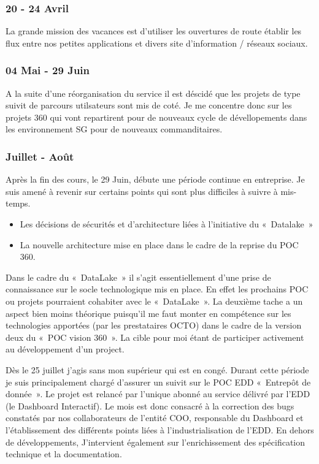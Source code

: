 \subsubsection*{20 - 24 Avril}
La grande mission des vacances est d'utiliser les ouvertures de route établir les flux entre nos petites applications et divers site d'information / réseaux sociaux.

\subsubsection*{04 Mai - 29 Juin}
A la suite d'une réorganisation du service il est déscidé que les projets de type suivit de parcours utilsateurs sont mis de coté. Je me concentre donc sur les projets 360 qui vont repartirent pour de nouveaux cycle de dévellopements dans les environnement SG pour de nouveaux commanditaires.
 

\subsubsection*{Juillet - Août}
\par
	Après la fin des cours, le 29 Juin, débute une période continue en entreprise.
Je suis amené à revenir sur certains points qui sont plus difficiles à suivre à mis-temps.
\begin{itemize}
\item Les décisions de sécurités et d’architecture liées à l’initiative du « Datalake »
\item La nouvelle architecture mise en place dans le cadre de la reprise du POC 360.
\end{itemize}
Dans le cadre du « DataLake » il s’agit essentiellement d’une prise de connaissance sur le socle technologique mis en place. En effet les prochains POC ou projets pourraient cohabiter avec le « DataLake ». La deuxième tache a un aspect bien moins théorique puisqu’il me faut monter en compétence sur les technologies apportées (par les prestataires OCTO) dans le cadre de la version deux du « POC vision 360 ».  La cible pour moi étant de participer activement au développement d’un project.
\par
	Dès le 25 juillet j’agis sans mon supérieur qui est en congé. Durant cette période je
suis principalement chargé d’assurer un suivit sur le POC EDD « Entrepôt de
donnée ». Le projet est relancé par l’unique abonné au service délivré par l’EDD 
(le Dashboard Interactif). Le mois est donc consacré à la correction des bugs constatés 
par nos collaborateurs de l’entité COO, responsable du Dashboard et l’établissement
des différents points liées à l’industrialisation de l’EDD. En dehors de développements,   
J’intervient également sur l’enrichissement des spécification technique et la
documentation. 

